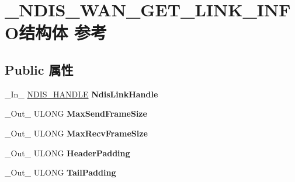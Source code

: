 \hypertarget{struct___n_d_i_s___w_a_n___g_e_t___l_i_n_k___i_n_f_o}{}\section{\+\_\+\+N\+D\+I\+S\+\_\+\+W\+A\+N\+\_\+\+G\+E\+T\+\_\+\+L\+I\+N\+K\+\_\+\+I\+N\+F\+O结构体 参考}
\label{struct___n_d_i_s___w_a_n___g_e_t___l_i_n_k___i_n_f_o}
\subsection*{Public 属性}
\begin{DoxyCompactItemize}
\item 
\mbox{\label{struct___n_d_i_s___w_a_n___g_e_t___l_i_n_k___i_n_f_o_acbe93a07ac622c48d6e1c0e4edec8ffd}} 
\+\_\+\+In\+\_\+ \hyperlink{interfacevoid}{N\+D\+I\+S\+\_\+\+H\+A\+N\+D\+LE} {\bfseries Ndis\+Link\+Handle}
\item 
\mbox{\label{struct___n_d_i_s___w_a_n___g_e_t___l_i_n_k___i_n_f_o_a4af121ec0a3a38938a218df64b9364ff}} 
\+\_\+\+Out\+\_\+ U\+L\+O\+NG {\bfseries Max\+Send\+Frame\+Size}
\item 
\mbox{\label{struct___n_d_i_s___w_a_n___g_e_t___l_i_n_k___i_n_f_o_ac6f23e3ec75c77f62651620d608696ac}} 
\+\_\+\+Out\+\_\+ U\+L\+O\+NG {\bfseries Max\+Recv\+Frame\+Size}
\item 
\mbox{\label{struct___n_d_i_s___w_a_n___g_e_t___l_i_n_k___i_n_f_o_a93e3df58154541396b4509c332ba1c1a}} 
\+\_\+\+Out\+\_\+ U\+L\+O\+NG {\bfseries Header\+Padding}
\item 
\mbox{\label{struct___n_d_i_s___w_a_n___g_e_t___l_i_n_k___i_n_f_o_aceb7c329f6cf070aff451aed5d4aff6d}} 
\+\_\+\+Out\+\_\+ U\+L\+O\+NG {\bfseries Tail\+Padding}
\item 
\mbox{\label{struct___n_d_i_s___w_a_n___g_e_t___l_i_n_k___i_n_f_o_a7b7677a15f06b8a6702e97bbb7ae24af}} 

\end{DoxyCompactItemize}
